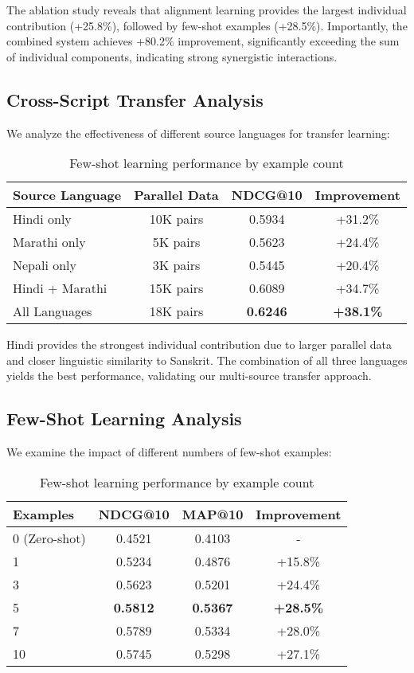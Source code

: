 \documentclass[runningheads]{llncs}
\begin{document}
\begin{table}
\begin{table}
The ablation study reveals that alignment learning provides the largest individual contribution (+25.8\%), followed by few-shot examples (+28.5\%). Importantly, the combined system achieves +80.2\% improvement, significantly exceeding the sum of individual components, indicating strong synergistic interactions.

\subsection{Cross-Script Transfer Analysis}

We analyze the effectiveness of different source languages for transfer learning:

\begin{table}
\caption{Cross-script transfer by source language}\label{tab:transfer}
\begin{tabular}{lccc}
\toprule
\textbf{Source Language} & \textbf{Parallel Data} & \textbf{NDCG@10} & \textbf{Improvement} \\
\midrule
Hindi only & 10K pairs & 0.5934 & +31.2\% \\
Marathi only & 5K pairs & 0.5623 & +24.4\% \\
Nepali only & 3K pairs & 0.5445 & +20.4\% \\
Hindi + Marathi & 15K pairs & 0.6089 & +34.7\% \\
All Languages & 18K pairs & \textbf{0.6246} & \textbf{+38.1\%} \\
\bottomrule
\end{tabular}
\end{table}

Hindi provides the strongest individual contribution due to larger parallel data and closer linguistic similarity to Sanskrit. The combination of all three languages yields the best performance, validating our multi-source transfer approach.

\subsection{Few-Shot Learning Analysis}

We examine the impact of different numbers of few-shot examples:

\begin{table}
\caption{Few-shot learning performance by example count}\label{tab:fewshot}
\begin{tabular}{lccc}
\toprule
\textbf{Examples} & \textbf{NDCG@10} & \textbf{MAP@10} & \textbf{Improvement} \\
\midrule
0 (Zero-shot) & 0.4521 & 0.4103 & - \\
1 & 0.5234 & 0.4876 & +15.8\% \\
3 & 0.5623 & 0.5201 & +24.4\% \\
5 & \textbf{0.5812} & \textbf{0.5367} & \textbf{+28.5\%} \\
7 & 0.5789 & 0.5334 & +28.0\% \\
10 & 0.5745 & 0.5298 & +27.1\% \\
\bottomrule
\end{tabular}
\end{table}


\end{table}
\end{table}
\end{document}
